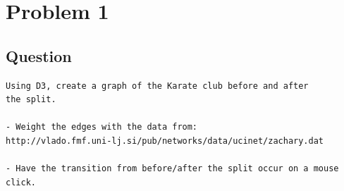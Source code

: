 \section{Problem 1}
\label{part1}
\subsection*{Question}
\begingroup
\begin{verbatim}
Using D3, create a graph of the Karate club before and after
the split.

- Weight the edges with the data from: 
http://vlado.fmf.uni-lj.si/pub/networks/data/ucinet/zachary.dat

- Have the transition from before/after the split occur on a mouse
click.

\end{verbatim}
\newpage
